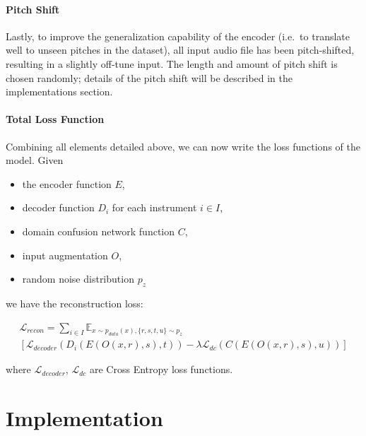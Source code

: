 \documentclass[]{report}
\providecommand{\tightlist}{%
  \setlength{\itemsep}{0pt}\setlength{\parskip}{0pt}}
\begin{document}
\hypertarget{pitch-shift}{%
\subsubsection{Pitch Shift}\label{pitch-shift}}

Lastly, to improve the generalization capability of the encoder (i.e.~to
translate well to unseen pitches in the dataset), all input audio file
has been pitch-shifted, resulting in a slightly off-tune input. The
length and amount of pitch shift is chosen randomly; details of the
pitch shift will be described in the implementations section.

\hypertarget{total-loss-function}{%
\subsubsection{Total Loss Function}\label{total-loss-function}}

Combining all elements detailed above, we can now write the loss
functions of the model. Given

\begin{itemize}
\tightlist
\item
  the encoder function \(E\),
\item
  decoder function \(D_i\) for each instrument \(i \in I\),
\item
  domain confusion network function \(C\),
\item
  input augmentation \(O\),
\item
  random noise distribution \(p_z\)
\end{itemize}

we have the reconstruction loss:

\begin{multline}
    \mathcal{L}_{recon} = \sum_{i \in I} \mathbb{E}_{x \sim p_{data}(x), \{r, s, t, u\} \sim p_{z}} \\
    [\mathcal{L}_{decoder}(D_i(E(O(x, r), s), t))  - \lambda \mathcal{L}_{dc}(C(E(O(x, r), s), u))]
\end{multline}

where \(\mathcal{L}_{decoder}\), \(\mathcal{L}_{dc}\) are Cross Entropy
loss functions.

\hypertarget{implementation}{%
\chapter{Implementation}\label{implementation}}
\end{document}
